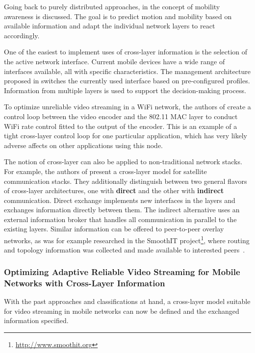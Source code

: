 Going back to purely distributed approaches, in \cite{hummel2010mobilitaet} the concept of mobility awareness is discussed. The goal is to predict motion and mobility based on available information and adapt the individual network layers to react accordingly. 

One of the easiest to implement uses of cross-layer information is the selection of the active network interface. Current mobile devices have a wide range of interfaces available, all with specific characteristics. The management architecture proposed in  \cite{Bonnin:2009:AMM:1503496.1503498} switches the currently used interface based on pre-configured profiles. Information from multiple layers is used to support the decision-making process.

To optimize unreliable video streaming in a WiFi network, the authors of \cite{1580941} create a control loop between the video encoder and the 802.11 \gls{MAC} layer to conduct WiFi rate control fitted to the output of the encoder. This is an example of a tight cross-layer control loop for one particular application, which has very likely adverse affects on other applications using this node.

The notion of cross-layer can also be applied to non-traditional network stacks. For example, the authors of \cite{4656786} present a cross-layer model for satellite communication stacks. They additionally distinguish between two general flavors of cross-layer architectures, one with \textbf{direct} and the other with \textbf{indirect} communication. Direct exchange implements new interfaces in the layers and exchanges information directly between them.  The indirect alternative uses an external information broker that handles all communication in parallel to the existing layers. Similar information can be offered to peer-to-peer overlay networks, as was for example researched in the SmoothIT project\footnote{\url{http://www.smoothit.org}}, where routing and topology information was collected and made available to interested peers~\cite{oechsner2009pushing}.


\subsubsection{Optimizing Adaptive Reliable Video Streaming for Mobile Networks with Cross-Layer Information}

With the past approaches and classifications at hand, a cross-layer model suitable for video streaming in mobile networks can now be defined and the exchanged information specified.

